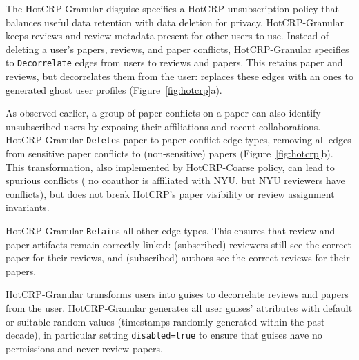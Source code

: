 The HotCRP-Granular disguise specifies a HotCRP unsubscription policy that balances useful data
retention with data deletion for privacy. HotCRP-Granular keeps reviews and review metadata present
for other users to use. 
%
Instead of deleting a user's papers, reviews, and paper conflicts, HotCRP-Granular specifies
to \texttt{Decorrelate} edges from users to reviews and papers. This retains paper and
reviews, but decorrelates them from the user: \sys replaces these edges with an ones to generated
ghost user profiles (Figure~\ref{fig:hotcrp}a).

As observed earlier, a group of paper conflicts on a paper can also identify unsubscribed users by
exposing their affiliations and recent collaborations. HotCRP-Granular \texttt{Delete}s
paper-to-paper conflict edge types, removing all edges from sensitive paper conflicts to
(non-sensitive) papers (Figure~\ref{fig:hotcrp}b). 
%
This transformation, also implemented by HotCRP-Coarse policy, can lead to spurious conflicts (\eg
no coauthor is affiliated with NYU, but NYU reviewers have conflicts), but does not break HotCRP's
paper visibility or review assignment invariants.

HotCRP-Granular \texttt{Retain}s all other edge types. This ensures that review and paper artifacts
remain correctly linked: (subscribed) reviewers still see the correct paper for their reviews, and
(subscribed) authors see the correct reviews for their papers.
 

HotCRP-Granular transforms users into guises to decorrelate reviews and papers from the
user. HotCRP-Granular generates all user guises' attributes with default or suitable random values
(\eg timestamps randomly generated within the past decade), in particular setting
\texttt{disabled=true} to ensure that guises have no permissions and never review papers. 

